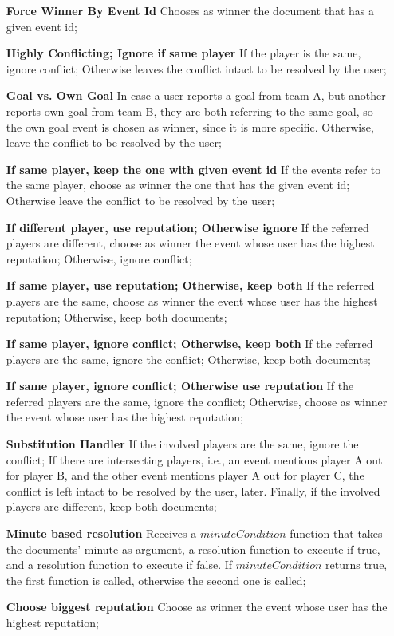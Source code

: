 \begin{itemize}[leftmargin  = 3.25\parindent, align=left]
    \item[\textbf{Force Winner By Event Id}] Chooses as winner the document that has a given event id;
    \item[\textbf{Highly Conflicting; Ignore if same player}] If the player is the same, ignore conflict; Otherwise leaves the conflict intact to be resolved by the user;
    \item[\textbf{Goal vs. Own Goal}] In case a user reports a goal from team A, but another reports own goal from team B, they are both referring to the same goal, so the own goal event is chosen as winner, since it is more specific. Otherwise, leave the conflict to be resolved by the user;
    \item[\textbf{If same player, keep the one with given event id}] If the events refer to the same player, choose as winner the one that has the given event id; Otherwise leave the conflict to be resolved by the user;
    \item[\textbf{If different player, use reputation; Otherwise ignore}] If the referred players are different, choose as winner the event whose user has the highest reputation; Otherwise, ignore conflict;
    \item[\textbf{If same player, use reputation; Otherwise, keep both}] If the referred players are the same, choose as winner the event whose user has the highest reputation; Otherwise, keep both documents;
    \item[\textbf{If same player, ignore conflict; Otherwise, keep both}] If the referred players are the same, ignore the conflict; Otherwise, keep both documents;
    \item[\textbf{If same player, ignore conflict; Otherwise use reputation}] If the referred players are the same, ignore the conflict; Otherwise, choose as winner the event whose user has the highest reputation;
    \item[\textbf{Substitution Handler}] If the involved players are the same, ignore the conflict; If there are intersecting players, i.e., an event mentions player A out for player B, and the other event mentions player A out for player C, the conflict is left intact to be resolved by the user, later. Finally, if the involved players are different, keep both documents;
    \item[\textbf{Minute based resolution}] Receives a $minuteCondition$ function that takes the documents' minute as argument, a resolution function to execute if true, and a resolution function to execute if false. If $minuteCondition$ returns true, the first function is called, otherwise the second one is called;
    \item[\textbf{Choose biggest reputation}] Choose as winner the event whose user has the highest reputation;
\end{itemize}

